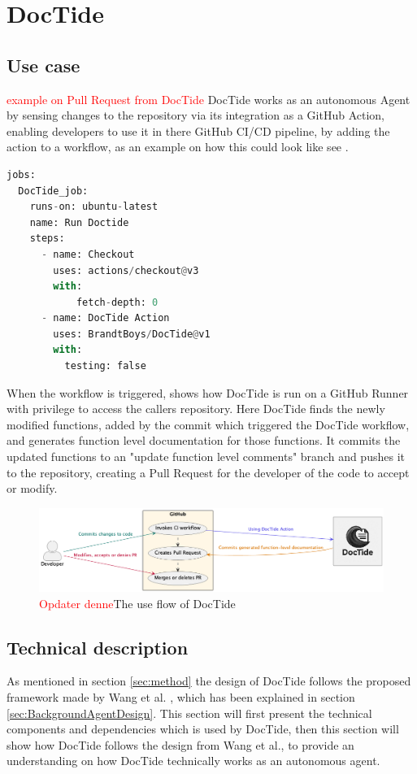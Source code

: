 \section{DocTide}
\label{sec:DesignDocTide}
\subsection{Use case}
\textcolor{red}{example on Pull Request from DocTide }
DocTide works as an autonomous Agent by sensing changes to the repository via its integration as a GitHub Action, enabling developers to use it in there GitHub CI/CD pipeline, by adding the action to a workflow, as an example on how this could look like see .
\begin{lstlisting}[language=Python, label={lst:flow}, caption=Example on how to use DocTide in a workflow]
jobs:
  DocTide_job:
    runs-on: ubuntu-latest
    name: Run Doctide
    steps:
      - name: Checkout
        uses: actions/checkout@v3
        with:
            fetch-depth: 0
      - name: DocTide Action
        uses: BrandtBoys/DocTide@v1
        with:
          testing: false
\end{lstlisting}
When the workflow is triggered,  shows how DocTide is run on a GitHub Runner with privilege to access the callers repository. Here DocTide finds the newly modified functions, added by the commit which triggered the DocTide workflow, and generates function level documentation for those functions. It commits the updated functions to an "update function level comments" branch and pushes it to the repository, creating a Pull Request for the developer of the code to accept or modify.
\begin{figure}[H]
\centering
\includegraphics[width=1\linewidth]{Figures/doctide_flow.png}
\caption{\textcolor{red}{Opdater denne}The use flow of DocTide}
\label{fig:flow_doctide}
\end{figure}
\subsection{Technical description}
As mentioned in section \ref{sec:method} the design of DocTide follows the proposed framework made by Wang et al. \cite{wang2024survey}, which has been explained in section \ref{sec:BackgroundAgentDesign}. This section will first present the technical components and dependencies which is used by DocTide, then this section will show how DocTide follows the design from Wang et al., to provide an understanding on how DocTide technically works as an autonomous agent.

